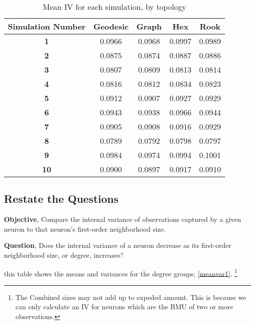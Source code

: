 \begin{table}
\centering
\caption{Mean IV for each simulation, by topology}
\label{ivtable3}
\begin{tabular}{|c||c|c|c|c|}
\hline
\textbf{Simulation Number} & Geodesic & Graph & Hex & Rook \\
\hline
\hline
\textbf{1} & 0.0966 & 0.0968 & 0.0997 & 0.0989 \\
\hline
\textbf{2} & 0.0875 & 0.0874 & 0.0887 & 0.0886 \\
\hline
\textbf{3} & 0.0807 & 0.0809 & 0.0813 & 0.0814 \\
\hline
\textbf{4} & 0.0816 & 0.0812 & 0.0834 & 0.0823 \\
\hline
\textbf{5} & 0.0912 & 0.0907 & 0.0927 & 0.0929 \\
\hline
\textbf{6} & 0.0943 & 0.0938 & 0.0966 & 0.0944 \\
\hline
\textbf{7} & 0.0905 & 0.0908 & 0.0916 & 0.0929 \\
\hline
\textbf{8} & 0.0789 & 0.0792 & 0.0798 & 0.0797 \\
\hline
\textbf{9} & 0.0984 & 0.0974 & 0.0994 & 0.1001 \\
\hline
\textbf{10} & 0.0900 & 0.0897 & 0.0917 & 0.0910 \\
\hline
\end{tabular} \end{table}



\subsection{Restate the Questions}
\textbf{Objective}, Compare the internal variance of observations captured by a given
neuron to that neuron's first-order neighborhood size.

\textbf{Question}, Does the internal variance of a neuron decrease as its first-order
neighborhood size, or degree, increases?



this table shows the means and variances for the degree groups,
\ref{meanvar1}. \footnote{The Combined sizes may not add up to expeded amount.
This is because we can only calculate an IV for neurons which are the BMU of
two or more observations.}

